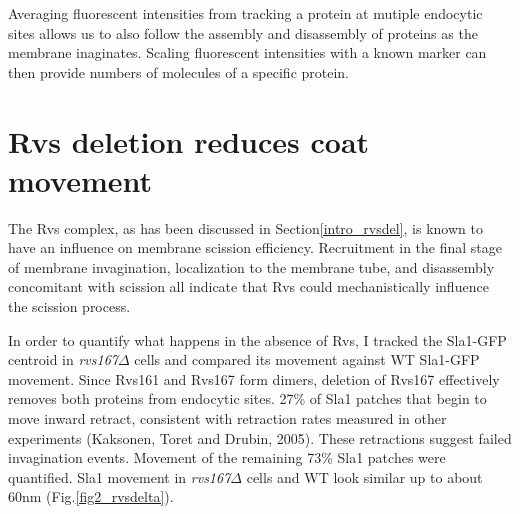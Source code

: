 \vspace{5mm}
Averaging fluorescent intensities from tracking a protein at mutiple endocytic sites allows us to also follow the assembly and disassembly of proteins as the membrane inaginates. Scaling fluorescent intensities with a known marker can then provide numbers of molecules of a specific protein.


\newpage
\section{Rvs deletion reduces coat movement}
\label{sec:rvsdel}
The Rvs complex, as has been discussed in Section\ref{intro_rvsdel}, is known to have an influence on membrane scission efficiency. Recruitment in the final stage of membrane invagination, localization to the membrane tube, and disassembly concomitant with scission all indicate that Rvs could mechanistically influence the scission process.

	\vspace{5mm}
In order to quantify what happens in the absence of Rvs, I tracked the Sla1-GFP centroid in \textit{rvs167$\Delta$} cells and compared its movement against WT Sla1-GFP movement. Since Rvs161 and Rvs167 form dimers, deletion of Rvs167 effectively removes both proteins from endocytic sites. 27\% of Sla1 patches that begin to move inward retract, consistent with retraction rates measured in other experiments (Kaksonen, Toret and Drubin, 2005). These retractions suggest failed invagination events. Movement of the remaining 73\% Sla1 patches were quantified. Sla1 movement in \textit{rvs167$\Delta$} cells and WT look similar up to about 60nm (Fig.\ref{fig2_rvsdelta}). 

\vspace{2mm}
	
